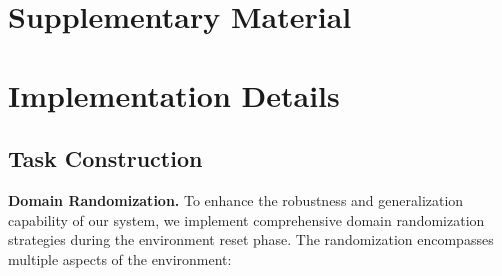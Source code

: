 \clearpage
\section*{\Large Supplementary Material}


\section*{Implementation Details}

\subsection{Task Construction}\label{appendix:task_construction}

\noindent \textbf{Domain Randomization.} To enhance the robustness and generalization capability of our system, we implement comprehensive domain randomization strategies during the environment reset phase. The randomization encompasses multiple aspects of the environment:


